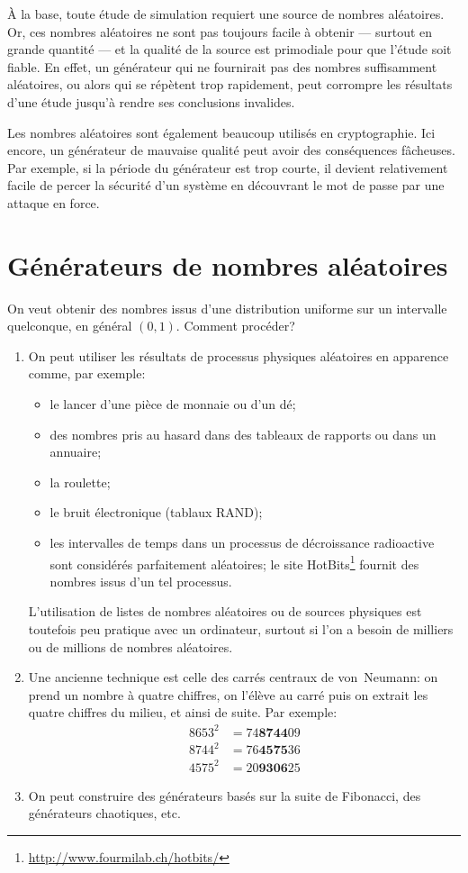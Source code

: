 À la base, toute étude de simulation requiert une source de nombres
aléatoires. Or, ces nombres aléatoires ne sont pas toujours facile à
obtenir --- surtout en grande quantité --- et la qualité de la source
est primodiale pour que l'étude soit fiable. En effet, un générateur
qui ne fournirait pas des nombres suffisamment aléatoires, ou alors
qui se répètent trop rapidement, peut corrompre les résultats d'une
étude jusqu'à rendre ses conclusions invalides.

Les nombres aléatoires sont également beaucoup utilisés en
cryptographie. Ici encore, un générateur de mauvaise qualité peut
avoir des conséquences fâcheuses. Par exemple, si la période du
générateur est trop courte, il devient relativement facile de percer
la sécurité d'un système en découvrant le mot de passe par une attaque
en force.


\section{Générateurs de nombres aléatoires}
\label{sec:generation:generateurs}

On veut obtenir des nombres issus d'une distribution uniforme sur un
intervalle quelconque, en général $(0, 1)$. Comment procéder?
\begin{enumerate}
\item On peut utiliser les résultats de processus physiques aléatoires
  en apparence comme, par exemple:
  \begin{itemize}
  \item le lancer d'une pièce de monnaie ou d'un dé;
  \item des nombres pris au hasard dans des tableaux de rapports ou
    dans un annuaire;
  \item la roulette;
  \item le bruit électronique (tablaux RAND);
  \item les intervalles de temps dans un processus de décroissance
    radioactive sont considérés parfaitement aléatoires; le site
    HotBits\footnote{%
      \url{http://www.fourmilab.ch/hotbits/}} %
    fournit des nombres issus d'un tel processus.
  \end{itemize}
  L'utilisation de listes de nombres aléatoires ou de sources
  physiques est toutefois peu pratique avec un ordinateur, surtout si
  l'on a besoin de milliers ou de millions de nombres aléatoires.
\item Une ancienne technique est celle des carrés centraux de
  von~Neumann: on prend un nombre à quatre chiffres, on l'élève au
  carré puis on extrait les quatre chiffres du milieu, et ainsi de
  suite. Par exemple:
  \begin{align*}
    8653^2 &= 74\mathbf{8744}09 \\
    8744^2 &= 76\mathbf{4575}36 \\
    4575^2 &= 20\mathbf{9306}25
  \end{align*}
\item On peut construire des générateurs basés sur la suite de
  Fibonacci, des générateurs chaotiques, etc.
\end{enumerate}


